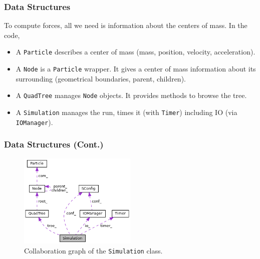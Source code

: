 \begin{frame}
	\frametitle{Data Structures}
	To compute forces, all we need is information about the centers of mass. In the code,
	\begin{itemize}
		\item A \lstinline{Particle} describes a center of mass (mass, position, velocity, acceleration).
		\item A \lstinline{Node} is a \lstinline{Particle} wrapper. It gives a center of mass information about its surrounding (geometrical boundaries, parent, children).
		\item A \lstinline{QuadTree} manages \lstinline{Node} objects. It provides methods to browse the tree.
		\item A \lstinline{Simulation} manages the run, times it (with \lstinline|Timer|) including IO (via \lstinline{IOManager}).
	\end{itemize}
\end{frame}

\begin{frame}
	\frametitle{Data Structures (Cont.)}
	\begin{figure}
		\centering
		\includegraphics[width=0.5\textwidth]{inclfigs/class_simulation.png}
		\caption{Collaboration graph of the \lstinline|Simulation| class.}
	\end{figure}
\end{frame}

